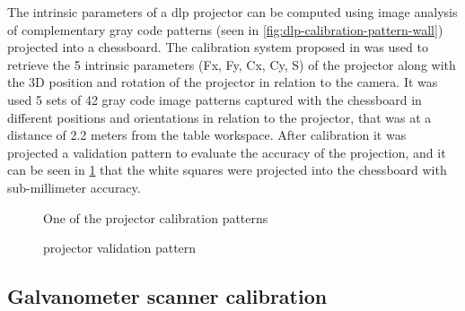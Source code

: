 The intrinsic parameters of a \gls{dlp} projector can be computed using image analysis of complementary gray code patterns (seen in \cref{fig:dlp-calibration-pattern-wall}) projected into a chessboard. The calibration system proposed in \cite{Moreno2012} was used to retrieve the 5 intrinsic parameters (Fx, Fy, Cx, Cy, S) of the projector along with the 3D position and rotation of the projector in relation to the camera. It was used 5 sets of 42 gray code image patterns captured with the chessboard in different positions and orientations in relation to the projector, that was at a distance of 2.2 meters from the table workspace. After calibration it was projected a validation pattern to evaluate the accuracy of the projection, and it can be seen in \cref{fig:dlp-projected-chessboard} that the white squares were projected into the chessboard with sub-millimeter accuracy.


\begin{figure}[H]
	\begin{floatrow}[2]
		{\caption{One of the  projector calibration patterns}\label{fig:dlp-calibration-pattern-wall}}
		{\caption{ projector validation pattern}\label{fig:dlp-projected-chessboard}}
	\end{floatrow}
\end{figure}


\subsection{Galvanometer scanner calibration}

